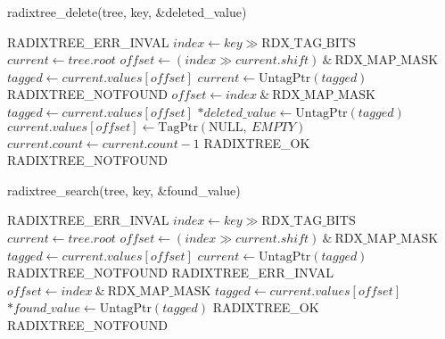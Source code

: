 \documentclass{article}
\begin{document}
\begin{algorithm}
  \caption{radixtree\_delete(tree, key, \&deleted\_value)}
  \begin{algorithmic}[1]
    \State \Return RADIXTREE\_ERR\_INVAL
    \EndIf
    \State $index \gets key \gg \mathrm{RDX\_TAG\_BITS}$
    \State $current \gets tree.root$
    \State $offset \gets (index \gg current.shift)\ \&\ \mathrm{RDX\_MAP\_MASK}$
    \State $tagged \gets current.values[offset]$
    \State $current \gets \mathrm{UntagPtr}(tagged)$
    \Else
    \State \Return RADIXTREE\_NOTFOUND
    \EndIf
    \EndWhile
    \State $offset \gets index\ \&\ \mathrm{RDX\_MAP\_MASK}$
    \State $tagged \gets current.values[offset]$
    \State $\ast deleted\_value \gets \mathrm{UntagPtr}(tagged)$
    \EndIf
    \State $current.values[offset] \gets \mathrm{TagPtr}(\mathrm{NULL},\ EMPTY)$
    \State $current.count \gets current.count - 1$
    \State \Return RADIXTREE\_OK
    \EndIf
    \State \Return RADIXTREE\_NOTFOUND
    \EndProcedure
  \end{algorithmic}
\end{algorithm}

\begin{algorithm}
  \caption{radixtree\_search(tree, key, \&found\_value)}
  \begin{algorithmic}[1]
    \State \Return RADIXTREE\_ERR\_INVAL
    \EndIf
    \State $index \gets key \gg \mathrm{RDX\_TAG\_BITS}$
    \State $current \gets tree.root$
    \State $offset \gets (index \gg current.shift)\ \&\ \mathrm{RDX\_MAP\_MASK}$
    \State $tagged \gets current.values[offset]$
    \State $current \gets \mathrm{UntagPtr}(tagged)$
    \State \Return RADIXTREE\_NOTFOUND
    \Else
    \State \Return RADIXTREE\_ERR\_INVAL
    \EndIf
    \EndWhile
    \State $offset \gets index\ \&\ \mathrm{RDX\_MAP\_MASK}$
    \State $tagged \gets current.values[offset]$
    \State $\ast found\_value \gets \mathrm{UntagPtr}(tagged)$
    \EndIf
    \State \Return RADIXTREE\_OK
    \EndIf
    \State \Return RADIXTREE\_NOTFOUND
    \EndProcedure
  \end{algorithmic}
\end{algorithm}
\end{document}
